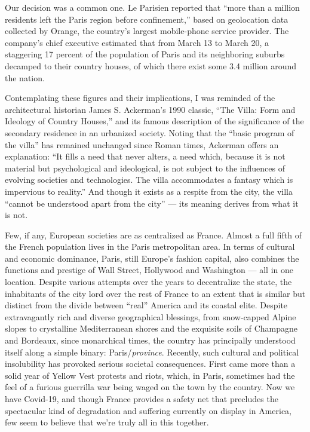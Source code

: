 Our decision was a common one. Le Parisien reported that ``more than a
million residents left the Paris region before confinement,'' based on
geolocation data collected by Orange, the country's largest mobile-phone
service provider. The company's chief executive estimated that from
March 13 to March 20, a staggering 17 percent of the population of Paris
and its neighboring suburbs decamped to their country houses, of which
there exist some 3.4 million around the nation.

Contemplating these figures and their implications, I was reminded of
the architectural historian James S. Ackerman's 1990 classic, ``The
Villa: Form and Ideology of Country Houses,'' and its famous description
of the significance of the secondary residence in an urbanized society.
Noting that the ``basic program of the villa'' has remained unchanged
since Roman times, Ackerman offers an explanation: ``It fills a need
that never alters, a need which, because it is not material but
psychological and ideological, is not subject to the influences of
evolving societies and technologies. The villa accommodates a fantasy
which is impervious to reality.'' And though it exists as a respite from
the city, the villa ``cannot be understood apart from the city'' --- its
meaning derives from what it is not.

Few, if any, European societies are as centralized as France. Almost a
full fifth of the French population lives in the Paris metropolitan
area. In terms of cultural and economic dominance, Paris, still Europe's
fashion capital, also combines the functions and prestige of Wall
Street, Hollywood and Washington --- all in one location. Despite
various attempts over the years to decentralize the state, the
inhabitants of the city lord over the rest of France to an extent that
is similar but distinct from the divide between ``real'' America and its
coastal elite. Despite extravagantly rich and diverse geographical
blessings, from snow-capped Alpine slopes to crystalline Mediterranean
shores and the exquisite soils of Champagne and Bordeaux, since
monarchical times, the country has principally understood itself along a
simple binary: Paris/\emph{province}. Recently, such cultural and
political insolubility has provoked serious societal consequences. First
came more than a solid year of Yellow Vest protests and riots, which, in
Paris, sometimes had the feel of a furious guerrilla war being waged on
the town by the country. Now we have Covid-19, and though France
provides a safety net that precludes the spectacular kind of degradation
and suffering currently on display in America, few seem to believe that
we're truly all in this together.

